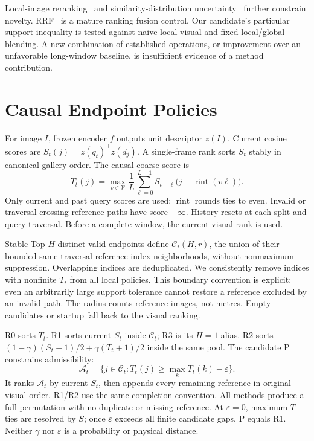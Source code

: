 \documentclass[conference]{IEEEtran}
\begin{document}
Local-image reranking~\cite{match} and similarity-distribution uncertainty~\cite{doubt} further constrain novelty. RRF~\cite{rrf} is a mature ranking fusion control. Our candidate's particular support inequality is tested against naive local visual and fixed local/global blending. A new combination of established operations, or improvement over an unfavorable long-window baseline, is insufficient evidence of a method contribution.

\section{Causal Endpoint Policies}
For image $I$, frozen encoder $f$ outputs unit descriptor $z(I)$. Current cosine scores are $S_t(j)=z(q_t)^\top z(d_j)$. A single-frame rank sorts $S_t$ stably in canonical gallery order. The causal coarse score is
\begin{equation}
T_t(j)=\max_{v\in\mathcal V}\frac{1}{L}\sum_{\ell=0}^{L-1} S_{t-\ell}\big(j-\operatorname{rint}(v\ell)\big).
\end{equation}
Only current and past query scores are used; $\operatorname{rint}$ rounds ties to even. Invalid or traversal-crossing reference paths have score $-\infty$. History resets at each split and query traversal. Before a complete window, the current visual rank is used.

Stable Top-$H$ distinct valid endpoints define $\mathcal C_t(H,r)$, the union of their bounded same-traversal reference-index neighborhoods, without nonmaximum suppression. Overlapping indices are deduplicated. We consistently remove indices with nonfinite $T_t$ from all local policies. This boundary convention is explicit: even an arbitrarily large support tolerance cannot restore a reference excluded by an invalid path. The radius counts reference images, not metres. Empty candidates or startup fall back to the visual ranking.

R0 sorts $T_t$. R1 sorts current $S_t$ inside $\mathcal C_t$; R3 is its $H=1$ alias. R2 sorts $(1-\gamma)(S_t+1)/2+\gamma(T_t+1)/2$ inside the same pool. The candidate P constrains admissibility:
\begin{equation}
\mathcal A_t=\{j\in\mathcal C_t:T_t(j)\ge \max_k T_t(k)-\varepsilon\}.
\end{equation}
It ranks $\mathcal A_t$ by current $S_t$, then appends every remaining reference in original visual order. R1/R2 use the same completion convention. All methods produce a full permutation with no duplicate or missing reference. At $\varepsilon=0$, maximum-$T$ ties are resolved by $S$; once $\varepsilon$ exceeds all finite candidate gaps, P equals R1. Neither $\gamma$ nor $\varepsilon$ is a probability or physical distance.
\end{document}
